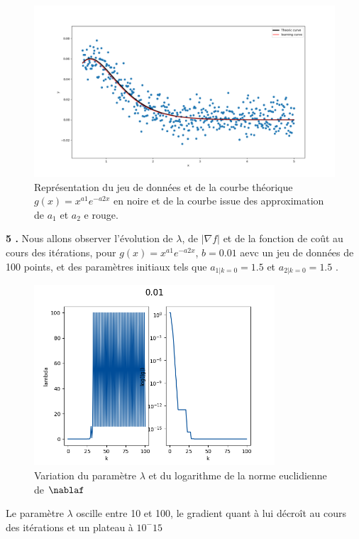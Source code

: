 \documentclass[12pt]{article}
\begin{document}
  
 \begin{figure}[H]
\centering
\includegraphics[width=1\textwidth]{Q15.png}
\caption{Représentation du jeu de données et de la courbe théorique $g(x)= x^{a1}e^{-a2x}$ en noire et de la courbe issue des approximation de $a_1$ et $a_2$ e rouge.}
\label{FigQ12}
\end{figure}
 
 \textbf{\color{brick}5 .} Nous allons observer l'évolution de $\lambda$, de $|\nabla f|$ et de la fonction de coût au cours des itérations, pour $g(x)=x^{a1}e^{-a2x} $, $b=0.01$ aevc un jeu de données de 100 points, et des paramètres initiaux tels que $a_{1|k=0}=1.5$ et $a_{2|k=0}=1.5$ . 
 
  \begin{figure}[H]
\centering
\includegraphics[width=0.8\textwidth]{Q161.png}
\caption{Variation du paramètre $\lambda$ et du logarithme de la norme euclidienne  de $\nablaf$}
\label{FigQ12}
\end{figure}
 
 Le paramètre $\lambda$ oscille entre 10 et 100, le gradient quant à lui décroît au cours des itérations et un plateau à $10^-15$
  
\end{document}
